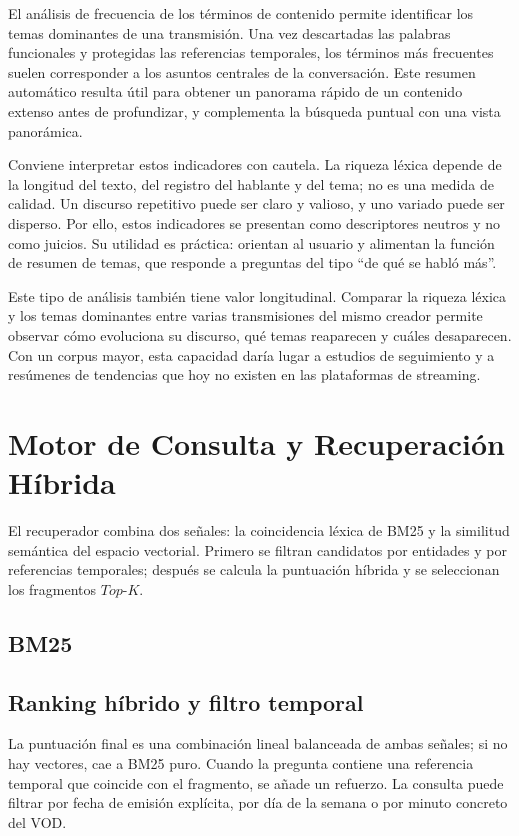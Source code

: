 \documentclass[12pt,a4paper]{article}
\begin{document}
El análisis de frecuencia de los términos de contenido permite identificar los temas dominantes de una transmisión. Una vez descartadas las palabras funcionales y protegidas las referencias temporales, los términos más frecuentes suelen corresponder a los asuntos centrales de la conversación. Este resumen automático resulta útil para obtener un panorama rápido de un contenido extenso antes de profundizar, y complementa la búsqueda puntual con una vista panorámica.

Conviene interpretar estos indicadores con cautela. La riqueza léxica depende de la longitud del texto, del registro del hablante y del tema; no es una medida de calidad. Un discurso repetitivo puede ser claro y valioso, y uno variado puede ser disperso. Por ello, estos indicadores se presentan como descriptores neutros y no como juicios. Su utilidad es práctica: orientan al usuario y alimentan la función de resumen de temas, que responde a preguntas del tipo ``de qué se habló más''.

Este tipo de análisis también tiene valor longitudinal. Comparar la riqueza léxica y los temas dominantes entre varias transmisiones del mismo creador permite observar cómo evoluciona su discurso, qué temas reaparecen y cuáles desaparecen. Con un corpus mayor, esta capacidad daría lugar a estudios de seguimiento y a resúmenes de tendencias que hoy no existen en las plataformas de streaming.


\section{Motor de Consulta y Recuperación Híbrida}
\label{sec:recuperacion}

El recuperador combina dos señales: la coincidencia léxica de BM25 \cite{bm25} y la similitud semántica del espacio vectorial. Primero se filtran candidatos por entidades y por referencias temporales; después se calcula la puntuación híbrida y se seleccionan los fragmentos $Top\text{-}K$.

\subsection{BM25}


\subsection{Ranking híbrido y filtro temporal}

La puntuación final es una combinación lineal balanceada de ambas señales; si no hay vectores, cae a BM25 puro. Cuando la pregunta contiene una referencia temporal que coincide con el fragmento, se añade un refuerzo. La consulta puede filtrar por fecha de emisión explícita, por día de la semana o por minuto concreto del VOD.
\end{document}
